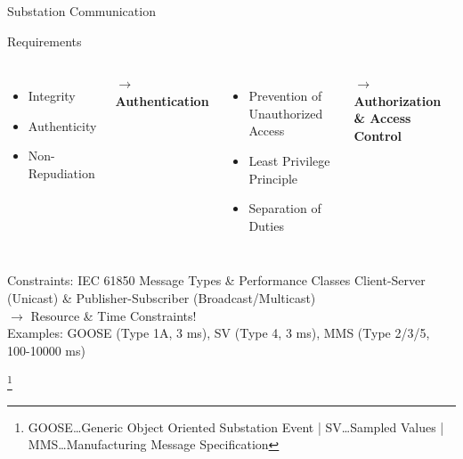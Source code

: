 \documentclass[en]{sdqbeamer}
\newcommand\nonumberfootnote[1]{%
  \begingroup
  \renewcommand\thefootnote{}\footnote{#1}%
  \addtocounter{footnote}{-1}%
  \endgroup
}
\begin{document}
\begin{frame}{Substation Communication}
    \begin{blueblock}{Requirements}
        \begin{columns}[T, onlytextwidth]
            \begin{itemize}
                \setlength{\itemindent}{-1em}
                \item Integrity
                \item Authenticity
                \item Non-Repudiation
            \end{itemize}
            $\rightarrow$ \textbf{Authentication}
            \begin{itemize}
                \setlength{\itemindent}{-1em}
                \item Prevention of Unauthorized Access
                \item Least Privilege Principle
                \item Separation of Duties
            \end{itemize}
            $\rightarrow$ \textbf{Authorization \& Access Control}
        \end{columns}
    \end{blueblock}
    \begin{grayblock}{Constraints: IEC 61850 Message Types \& Performance Classes \parencite*{IEC61850P5,IEC61850P8}}
        Client-Server (Unicast) \& Publisher-Subscriber (Broadcast/Multicast) \\$\rightarrow$ Resource \& Time Constraints!
        \\Examples: GOOSE (Type 1A, 3 ms), SV (Type 4, 3 ms), MMS (Type 2/3/5, 100-10000 ms)
    \end{grayblock}
    \nonumberfootnote{GOOSE\dots Generic Object Oriented Substation Event | SV\dots Sampled Values | MMS\dots Manufacturing Message Specification}
\end{frame}
\end{document}
